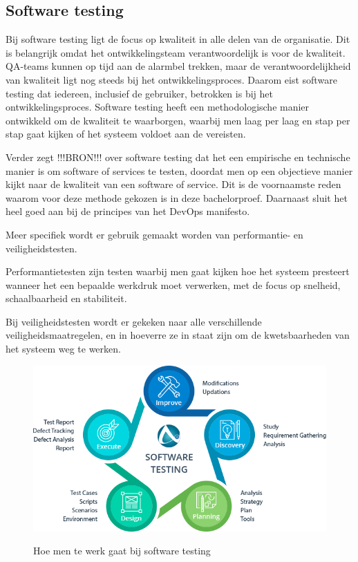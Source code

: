 
\subsection{Software testing}
\label{sec:testing-uitleg}
Bij software testing ligt de focus op kwaliteit in alle delen van de organisatie. Dit is belangrijk omdat het ontwikkelingsteam verantwoordelijk is voor de kwaliteit. QA-teams kunnen op tijd aan de alarmbel trekken, maar de verantwoordelijkheid van kwaliteit ligt nog steeds bij het ontwikkelingsproces. Daarom eist software testing dat iedereen, inclusief de gebruiker, betrokken is bij het ontwikkelingsproces. Software testing heeft een methodologische manier ontwikkeld om de kwaliteit te waarborgen, waarbij men laag per laag en stap per stap gaat kijken of het systeem voldoet aan de vereisten.

Verder zegt !!!BRON!!! over software testing dat het een empirische en technische manier is om software of services te testen, doordat men op een objectieve manier kijkt naar de kwaliteit van een software of service. Dit is de voornaamste reden waarom voor deze methode gekozen is in deze bachelorproef. Daarnaast sluit het heel goed aan bij de principes van het DevOps manifesto.

Meer specifiek wordt er gebruik gemaakt worden van performantie- en veiligheidstesten.

Performantietesten zijn testen waarbij men gaat kijken hoe het systeem presteert wanneer het een bepaalde werkdruk moet verwerken, met de focus op snelheid, schaalbaarheid en stabiliteit. \autocite{Noga2016}

Bij veiligheidstesten wordt er gekeken naar alle verschillende veiligheidsmaatregelen, en in hoeverre ze in staat zijn om de kwetsbaarheden van het systeem weg te werken. \autocite{Mark2012} \autocite{ThinkSys2017}

\begin{figure}
	\caption{Hoe men te werk gaat bij software testing}
	\includegraphics[scale=0.5]{img/testingprocess.png}
	\label{testingprocess}
\end{figure}

\autocite{Maurice2018} \autocite{CemKaner2006}